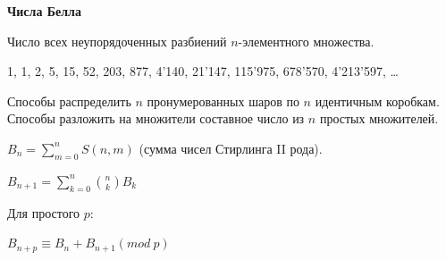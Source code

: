 \textbf{Числа Белла}

Число всех неупорядоченных разбиений $n$-элементного множества.

1, 1, 2, 5, 15, 52, 203, 877, 4'140, 21'147, 115'975, 678'570, 4'213'597, \dots

Способы распределить $n$ пронумерованных шаров по $n$ идентичным коробкам. Способы разложить на множители составное число из $n$ простых множителей.

$B_n = \sum_{m=0}^{n}S(n,m)$ (сумма чисел Стирлинга II рода).

$B_{n+1} = \sum_{k=0}^n \binom{n}{k}B_k$

Для простого $p$:

$B_{n+p} \equiv B_n + B_{n+1} (mod\ p)$
